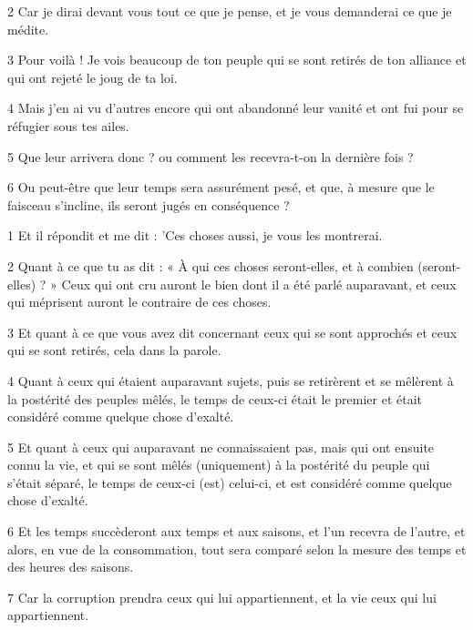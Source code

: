\par 2 Car je dirai devant vous tout ce que je pense, et je vous demanderai ce que je médite.

\par 3 Pour voilà ! Je vois beaucoup de ton peuple qui se sont retirés de ton alliance et qui ont rejeté le joug de ta loi.

\par 4 Mais j'en ai vu d'autres encore qui ont abandonné leur vanité et ont fui pour se réfugier sous tes ailes.

\par 5 Que leur arrivera donc ? ou comment les recevra-t-on la dernière fois ?

\par 6 Ou peut-être que leur temps sera assurément pesé, et que, à mesure que le faisceau s'incline, ils seront jugés en conséquence ?


\par 1 Et il répondit et me dit : 'Ces choses aussi, je vous les montrerai.

\par 2 Quant à ce que tu as dit : « À qui ces choses seront-elles, et à combien (seront-elles) ? » Ceux qui ont cru auront le bien dont il a été parlé auparavant, et ceux qui méprisent auront le contraire de ces choses.

\par 3 Et quant à ce que vous avez dit concernant ceux qui se sont approchés et ceux qui se sont retirés, cela dans la parole.

\par 4 Quant à ceux qui étaient auparavant sujets, puis se retirèrent et se mêlèrent à la postérité des peuples mêlés, le temps de ceux-ci était le premier et était considéré comme quelque chose d'exalté.

\par 5 Et quant à ceux qui auparavant ne connaissaient pas, mais qui ont ensuite connu la vie, et qui se sont mêlés (uniquement) à la postérité du peuple qui s'était séparé, le temps de ceux-ci (est) celui-ci, et est considéré comme quelque chose d'exalté.

\par 6 Et les temps succèderont aux temps et aux saisons, et l'un recevra de l'autre, et alors, en vue de la consommation, tout sera comparé selon la mesure des temps et des heures des saisons.

\par 7 Car la corruption prendra ceux qui lui appartiennent, et la vie ceux qui lui appartiennent.

